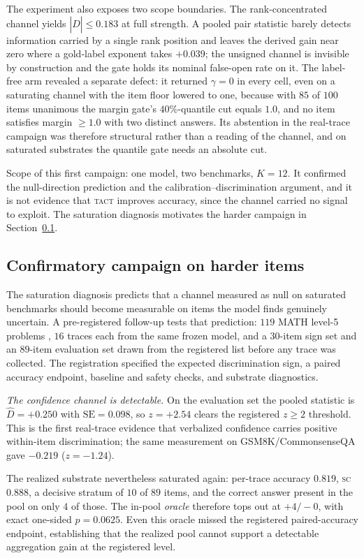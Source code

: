 \documentclass{article}
\newcommand{\Dhat}{\widehat{D}}
\newcommand{\SC}{\textsc{sc}}
\newcommand{\TACT}{\textsc{tact}}
\begin{document}
The experiment also exposes two scope boundaries. The
rank-concentrated channel yields $|\Dhat|\le0.183$ at full strength. A pooled
pair statistic barely detects information carried by a single rank position and
leaves the derived gain near zero where a gold-label exponent takes $+0.039$;
the unsigned channel is invisible by construction and the gate holds its
nominal false-open rate on it. The label-free arm revealed a separate defect: it
returned $\gamma=0$ in every cell, even on a saturating channel with the item floor
lowered to one, because with $85$ of $100$ items unanimous the margin gate's
$40\%$-quantile cut equals $1.0$, and no item satisfies margin $\ge 1.0$ with
two distinct answers. Its abstention in the real-trace campaign was therefore structural rather
than a reading of the channel, and on saturated substrates the quantile gate
needs an absolute cut.

Scope of this first campaign: one model, two benchmarks, $K{=}12$. It confirmed
the null-direction prediction and the calibration--discrimination argument, and
it is not evidence that \TACT{} improves accuracy, since the channel carried no
signal to exploit. The saturation diagnosis motivates the harder campaign in
Section~\ref{sec:hard}.

\subsection{Confirmatory campaign on harder items}\label{sec:hard}
The saturation diagnosis predicts that a channel measured as null on saturated benchmarks
should become measurable on items the model finds genuinely uncertain. A
pre-registered follow-up tests that prediction: $119$ MATH level-5 problems
\citep{math500,lightman2024verify}, $16$ traces each from the same frozen
model, and a $30$-item sign set and an $89$-item evaluation set drawn from the
registered list before any trace was collected. The registration specified the
expected discrimination sign, a paired accuracy endpoint, baseline and safety
checks, and substrate diagnostics.

\emph{The confidence channel is detectable.} On the evaluation set the pooled statistic is
$\Dhat=+0.250$ with $\mathrm{SE}=0.098$, so $z=+2.54$ clears the registered
$z\ge2$ threshold. This is
the first real-trace evidence that verbalized confidence carries positive
within-item discrimination; the same measurement on GSM8K/CommonsenseQA gave
$-0.219$ ($z=-1.24$).

The realized substrate nevertheless saturated again: per-trace accuracy
$0.819$, \SC{} $0.888$, a decisive
stratum of $10$ of $89$ items, and the correct answer present in the pool on
only $4$ of those. The in-pool \emph{oracle} therefore tops out at $+4/-0$,
with exact one-sided $p=0.0625$. Even this oracle missed the registered
paired-accuracy endpoint, establishing that the realized pool cannot support a
detectable aggregation gain at the registered level.
\end{document}
